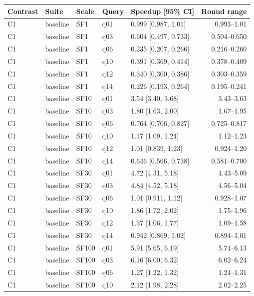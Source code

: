 \begin{longtable}{lllllr}
\toprule
Contrast & Suite & Scale & Query & Speedup [95\% CI] & Round range \\
\midrule
\endhead
\bottomrule
\endfoot
C1 & baseline & SF1 & q01 & 0.999 [0.987, 1.01] & 0.993--1.01 \\
C1 & baseline & SF1 & q03 & 0.604 [0.497, 0.733] & 0.504--0.650 \\
C1 & baseline & SF1 & q06 & 0.235 [0.207, 0.266] & 0.216--0.260 \\
C1 & baseline & SF1 & q10 & 0.391 [0.369, 0.414] & 0.378--0.409 \\
C1 & baseline & SF1 & q12 & 0.340 [0.300, 0.386] & 0.303--0.359 \\
C1 & baseline & SF1 & q14 & 0.226 [0.193, 0.264] & 0.195--0.241 \\
C1 & baseline & SF10 & q01 & 3.54 [3.40, 3.68] & 3.43--3.63 \\
C1 & baseline & SF10 & q03 & 1.80 [1.63, 2.00] & 1.67--1.95 \\
C1 & baseline & SF10 & q06 & 0.764 [0.706, 0.827] & 0.725--0.817 \\
C1 & baseline & SF10 & q10 & 1.17 [1.09, 1.24] & 1.12--1.23 \\
C1 & baseline & SF10 & q12 & 1.01 [0.839, 1.23] & 0.924--1.20 \\
C1 & baseline & SF10 & q14 & 0.646 [0.566, 0.738] & 0.581--0.700 \\
C1 & baseline & SF30 & q01 & 4.72 [4.31, 5.18] & 4.43--5.09 \\
C1 & baseline & SF30 & q03 & 4.84 [4.52, 5.18] & 4.56--5.04 \\
C1 & baseline & SF30 & q06 & 1.01 [0.911, 1.12] & 0.928--1.07 \\
C1 & baseline & SF30 & q10 & 1.86 [1.72, 2.02] & 1.75--1.96 \\
C1 & baseline & SF30 & q12 & 1.37 [1.06, 1.77] & 1.09--1.58 \\
C1 & baseline & SF30 & q14 & 0.942 [0.869, 1.02] & 0.894--1.01 \\
C1 & baseline & SF100 & q01 & 5.91 [5.65, 6.19] & 5.74--6.13 \\
C1 & baseline & SF100 & q03 & 6.16 [6.00, 6.32] & 6.02--6.24 \\
C1 & baseline & SF100 & q06 & 1.27 [1.22, 1.32] & 1.24--1.31 \\
C1 & baseline & SF100 & q10 & 2.12 [1.98, 2.28] & 2.02--2.25 \\

\end{longtable}
